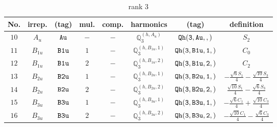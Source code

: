 \documentclass[fleqn,8pt]{jsarticle}
\begin{document}
\begin{table}[ht!]
\begin{center}
\caption{rank 3}
\renewcommand{\arraystretch}{1.3}
\begin{tabular}{cccccccc} \hline \hline
No. & irrep. & (tag) & mul. & comp. & harmonics & (tag) & definition \\ \hline
$ 10 $ & $ A_{u} $ & $ {\tt Au} $ & $ - $ & $ - $ & $ \mathbb{Q}_{3}^{(h,A_{u})} $ & $ {\tt Qh(3,Au,,)} $ & $ S_{2} $ \\
$ 11 $ & $ B_{1u} $ & $ {\tt B1u} $ & $ 1 $ & $ - $ & $ \mathbb{Q}_{3}^{(h,B_{1u},1)} $ & $ {\tt Qh(3,B1u,1,)} $ & $ C_{0} $ \\
$ 12 $ & $ B_{1u} $ & $ {\tt B1u} $ & $ 2 $ & $ - $ & $ \mathbb{Q}_{3}^{(h,B_{1u},2)} $ & $ {\tt Qh(3,B1u,2,)} $ & $ C_{2} $ \\
$ 13 $ & $ B_{2u} $ & $ {\tt B2u} $ & $ 1 $ & $ - $ & $ \mathbb{Q}_{3}^{(h,B_{2u},1)} $ & $ {\tt Qh(3,B2u,1,)} $ & $ - \frac{\sqrt{6} S_{1}}{4} - \frac{\sqrt{10} S_{3}}{4} $ \\
$ 14 $ & $ B_{2u} $ & $ {\tt B2u} $ & $ 2 $ & $ - $ & $ \mathbb{Q}_{3}^{(h,B_{2u},2)} $ & $ {\tt Qh(3,B2u,2,)} $ & $ \frac{\sqrt{10} S_{1}}{4} - \frac{\sqrt{6} S_{3}}{4} $ \\
$ 15 $ & $ B_{3u} $ & $ {\tt B3u} $ & $ 1 $ & $ - $ & $ \mathbb{Q}_{3}^{(h,B_{3u},1)} $ & $ {\tt Qh(3,B3u,1,)} $ & $ - \frac{\sqrt{6} C_{1}}{4} + \frac{\sqrt{10} C_{3}}{4} $ \\
$ 16 $ & $ B_{3u} $ & $ {\tt B3u} $ & $ 2 $ & $ - $ & $ \mathbb{Q}_{3}^{(h,B_{3u},2)} $ & $ {\tt Qh(3,B3u,2,)} $ & $ - \frac{\sqrt{10} C_{1}}{4} - \frac{\sqrt{6} C_{3}}{4} $ \\
 \hline \hline
\end{tabular}
\end{center}
\end{table}
\end{document}
